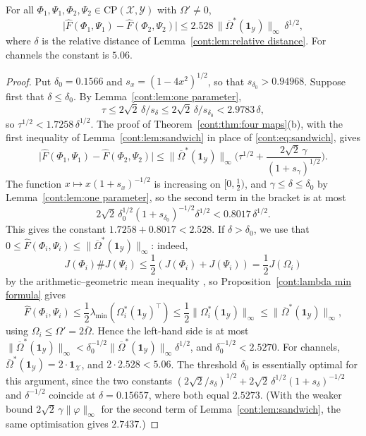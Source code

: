 \begin{corollary}\label{cont:cor:universal}
For all $\Phi_1,\Psi_1,\Phi_2,\Psi_2\in\mathrm{CP}(\mathcal{X},\mathcal{Y})$ with $\Omega'\neq0$,
\[
\big|\widehat{F}(\Phi_1,\Psi_1)-\widehat{F}(\Phi_2,\Psi_2)\big|\leq2.528\,\|\overline{\Omega}^*(\mathbf{1}_{\mathcal{Y}})\|_\infty\,\delta^{1/2},
\]
where $\delta$ is the relative distance of Lemma~\ref{cont:lem:relative distance}. For channels the constant is $5.06$.
\end{corollary}

\begin{proof}
Put $\delta_0=0.1566$ and $s_x=(1-4x^2)^{1/2}$, so that $s_{\delta_0}>0.94968$. Suppose first that $\delta\leq\delta_0$. By Lemma~\ref{cont:lem:one parameter},
\[
\tau\leq2\sqrt2\,\delta/s_\delta\leq2\sqrt2\,\delta/s_{\delta_0}<2.9783\,\delta,
\]
so $\tau^{1/2}<1.7258\,\delta^{1/2}$. The proof of Theorem~\ref{cont:thm:four maps}(b), with the first inequality of Lemma~\ref{cont:lem:sandwich} in place of \eqref{cont:eq:sandwich}, gives
\[
\big|\widehat{F}(\Phi_1,\Psi_1)-\widehat{F}(\Phi_2,\Psi_2)\big|\leq\|\overline{\Omega}^*(\mathbf{1}_{\mathcal{Y}})\|_\infty\Big(\tau^{1/2}+\frac{2\sqrt2\,\gamma}{(1+s_\gamma)^{1/2}}\Big).
\]
The function $x\mapsto x(1+s_x)^{-1/2}$ is increasing on $[0,\frac12)$, and $\gamma\leq\delta\leq\delta_0$ by Lemma~\ref{cont:lem:one parameter}, so the second term in the bracket is at most
\[
2\sqrt2\,\delta_0^{1/2}(1+s_{\delta_0})^{-1/2}\delta^{1/2}<0.8017\,\delta^{1/2}.
\]
This gives the constant $1.7258+0.8017<2.528$.
If $\delta>\delta_0$, we use that $0\leq\widehat{F}(\Phi_i,\Psi_i)\leq\|\overline{\Omega}^*(\mathbf{1}_{\mathcal{Y}})\|_\infty$: indeed,
\[
J(\Phi_i)\#J(\Psi_i)\leq\frac12(J(\Phi_i)+J(\Psi_i))=\frac12J(\Omega_i)
\]
by the arithmetic--geometric mean inequality \cite{KuboAndo1980}, so Proposition~\ref{cont:lambda min formula} gives
\[
\widehat{F}(\Phi_i,\Psi_i)\leq\frac12\lambda_{\min}(\Omega_i^*(\mathbf{1}_{\mathcal{Y}})^\top)\leq\frac12\|\Omega_i^*(\mathbf{1}_{\mathcal{Y}})\|_\infty\leq\|\overline{\Omega}^*(\mathbf{1}_{\mathcal{Y}})\|_\infty,
\]
using $\Omega_i\leq\Omega'=2\overline{\Omega}$. Hence the left-hand side is at most $\|\overline{\Omega}^*(\mathbf{1}_{\mathcal{Y}})\|_\infty<\delta_0^{-1/2}\|\overline{\Omega}^*(\mathbf{1}_{\mathcal{Y}})\|_\infty\delta^{1/2}$, and $\delta_0^{-1/2}<2.5270$. For channels, $\overline{\Omega}^*(\mathbf{1}_{\mathcal{Y}})=2\cdot\mathbf{1}_{\mathcal{X}}$, and $2\cdot2.528<5.06$. %
The threshold $\delta_0$ is essentially optimal for this argument, since the two constants $(2\sqrt2/s_{\delta})^{1/2}+2\sqrt2\,\delta^{1/2}(1+s_\delta)^{-1/2}$ and $\delta^{-1/2}$ coincide at $\delta=0.15657$, where both equal $2.5273$. (With the weaker bound $2\sqrt2\,\gamma\|\varphi\|_\infty$ for the second term of Lemma~\ref{cont:lem:sandwich}, the same optimisation gives $2.7437$.) %
\end{proof}

